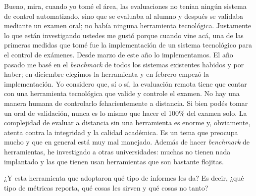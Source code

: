 \begin{description}[leftmargin=0cm, labelsep=0.5cm, style=nextline]
\item[\textbf{Entrevistado:}] Bueno, mira, cuando yo tomé el área, las evaluaciones no tenían ningún sistema de control automatizado, sino que se evaluaba al alumno y después se validaba mediante un examen oral; no había ninguna herramienta tecnológica. Justamente lo que están investigando ustedes me gustó porque cuando vine acá, una de las primeras medidas que tomé fue la implementación de un sistema tecnológico para el control de exámenes. Desde marzo de este año lo implementamos. El año pasado me basé en el \textit{benchmark} de todos los sistemas existentes habidos y por haber; en diciembre elegimos la herramienta y en febrero empezó la implementación. Yo considero que, sí o sí, la evaluación remota tiene que contar con una herramienta tecnológica que valide y controle el examen. No hay una manera humana de controlarlo fehacientemente a distancia. Si bien podés tomar un oral de validación, nunca es lo mismo que hacer el 100\% del examen solo. La complejidad de evaluar a distancia sin una herramienta es enorme y, obviamente, atenta contra la integridad y la calidad académica. Es un tema que preocupa mucho y que en general está muy mal manejado. Además de hacer \textit{benchmark} de herramientas, he investigado a otras universidades: muchas no tienen nada implantado y las que tienen usan herramientas que son bastante flojitas.
\item[\textbf{Entrevistador:}] ¿Y esta herramienta que adoptaron qué tipo de informes les da? Es decir, ¿qué tipo de métricas reporta, qué cosas les sirven y qué cosas no tanto?

\end{description}
